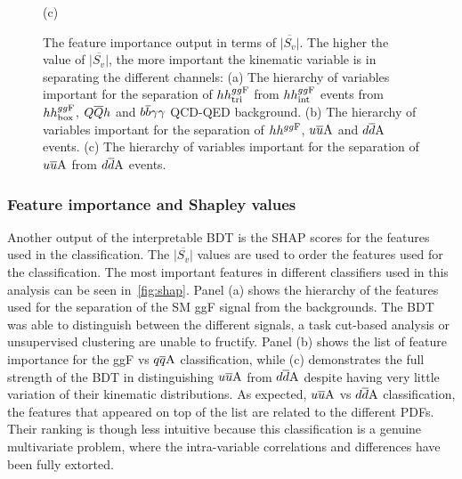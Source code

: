 \begin{figure}[t!]
	{  \footnotesize  (c)}
	\caption{The feature importance output in terms of $\overline{|S_v|}$. The higher the value of $\overline{|S_v|}$, the more important the kinematic variable is in separating the different channels: (a) The hierarchy of variables important for the separation of $hh^{gg\rm F}_{\rm tri}$ from $hh^{gg\rm F}_{\rm int}$ events from $hh^{gg\rm F}_{\rm box}$, $Q\overline Q h$ and $b\overline b\gamma\gamma$ QCD-QED background.  (b) The hierarchy of variables important for the separation of $hh^{gg\rm F}$, $u\overline u \rm A$ and $d\overline d \rm A$ events. (c) The hierarchy of variables important for the separation of $u\overline u \rm A$ from $d\overline d \rm A$ events.}
	\label{fig:shap}
\end{figure}
\subsubsection*{Feature importance and Shapley values}
Another output of the interpretable BDT is the SHAP scores for the features used in the classification.  The $\overline{|S_v|}$ values are used to order the features used for the classification. The most important features in different classifiers used in this analysis can be seen in~\autoref{fig:shap}. Panel (a) shows the hierarchy of the features used for the separation of the SM ggF signal from the backgrounds. The BDT was able to distinguish between the different signals, a task cut-based analysis or unsupervised clustering are unable to fructify. Panel (b) shows the list of feature importance for the ggF vs $q\overline q \rm A$ classification, while (c) demonstrates the full strength of the BDT in distinguishing $u\overline u \rm A$ from $d\overline d \rm A$ despite having very little variation of their kinematic distributions.  As expected, $u\overline u \rm A$ vs $d\overline d \rm A$ classification, the features that appeared on top of the list are related to the different PDFs. Their ranking is though less intuitive because this classification is a genuine multivariate problem, where the intra-variable correlations and differences have been fully extorted. 
